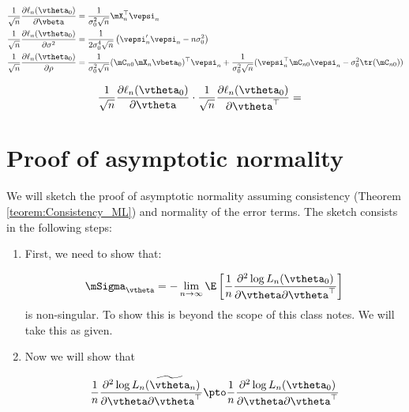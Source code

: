 \begin{subappendices}
\begin{align}
	\frac{1}{\sqrt{n}}\frac{\partial \ell_n(\vtheta_0)}{\partial \vbeta} & = \frac{1}{\sigma^2_0\sqrt{n}}\mX_n^\top\vepsi_n \\
	\frac{1}{\sqrt{n}}\frac{\partial \ell_n(\vtheta_0)}{\partial \sigma^2} & = \frac{1}{2\sigma_0^4\sqrt{n}}\left(\vepsi_n'\vepsi_n - n\sigma_0^2\right) \\
		\frac{1}{\sqrt{n}}\frac{\partial \ell_n(\vtheta_0)}{\partial \rho} & = \frac{1}{\sigma_0^2\sqrt{n}}(\mC_{n0}\mX_n\vbeta_0)^\top \vepsi_n + \frac{1}{\sigma_0^2\sqrt{n}}(\vepsi_n^\top\mC_{n0}\vepsi_n - \sigma_0^2\tr(\mC_{n0}))\label{eq:asy_der_rho}
\end{align}	

\begin{equation}
\begin{aligned}
  \frac{1}{\sqrt{n}}\frac{\partial \ell_n (\vtheta_0)}{\partial \vtheta}\cdot\frac{1}{\sqrt{n}}\frac{\partial \ell_n (\vtheta_0)}{\partial \vtheta^\top} & = 
  \end{aligned}
\end{equation}


 \section{Proof of asymptotic normality}\label{appendix-asymptotic normality}

We will sketch the proof of asymptotic normality assuming consistency (Theorem \ref{teorem:Consistency_ML}) and normality of the error terms. The sketch consists in the following steps: 
\begin{enumerate}
  \item First, we need to show that:
  
    \begin{equation*}
    \mSigma_{\vtheta} = - \lim_{n\to\infty} \E\left[\frac{1}{n}\frac{\partial^2 \log L_n(\vtheta_0)}{\partial \vtheta \partial \vtheta^\top}\right]
    \end{equation*}
    is non-singular. To show this is beyond the scope of this class notes. We will take this as given. 
  \item Now we will show that 
  
   \begin{equation*}
    \frac{1}{n}\frac{\partial^2 \log L_n(\widetilde{\vtheta}_n)}{\partial \vtheta \partial \vtheta^\top}\pto \frac{1}{n}\frac{\partial^2 \log L_n(\vtheta_0)}{\partial \vtheta \partial \vtheta^\top}
   \end{equation*}
   

\end{enumerate}
\end{subappendices}
